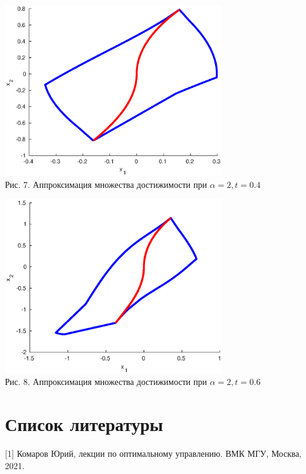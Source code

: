 \documentclass[11pt]{article}
\begin{document}
	\begin{center}
		\includegraphics[width=0.7\textwidth]{pic_t2.eps}\\
		{Рис. 7. Аппроксимация множества достижимости при $\alpha = 2, t = 0.4$ }
	\end{center}
	\begin{center}
		\includegraphics[width=0.7\textwidth]{pic_t3.eps}\\
		{Рис. 8. Аппроксимация множества достижимости при $\alpha = 2, t = 0.6$ }
	\end{center}
	\newpage
	{\section{Список литературы}}
	{\hspace*{-0.6cm}[1] Комаров Юрий, лекции по оптимальному управлению. ВМК МГУ, Москва, 2021.} 	
\end{document}
